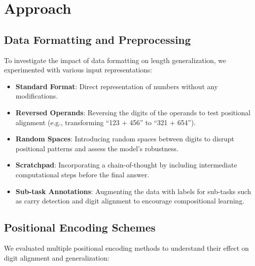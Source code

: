 \chapter{Approach}\label{approach}

\section{Data Formatting and Preprocessing}

To investigate the impact of data formatting on length generalization, we experimented with various input representations:

\begin{itemize}
    \item \textbf{Standard Format}: Direct representation of numbers without any modifications.
    \item \textbf{Reversed Operands}: Reversing the digits of the operands to test positional alignment (e.g., transforming ``123 + 456'' to ``321 + 654'').
    \item \textbf{Random Spaces}: Introducing random spaces between digits to disrupt positional patterns and assess the model's robustness.
    \item \textbf{Scratchpad}: Incorporating a chain-of-thought by including intermediate computational steps before the final answer.
    \item \textbf{Sub-task Annotations}: Augmenting the data with labels for sub-tasks such as carry detection and digit alignment to encourage compositional learning.
\end{itemize}

\section{Positional Encoding Schemes}

We evaluated multiple positional encoding methods to understand their effect on digit alignment and generalization:

